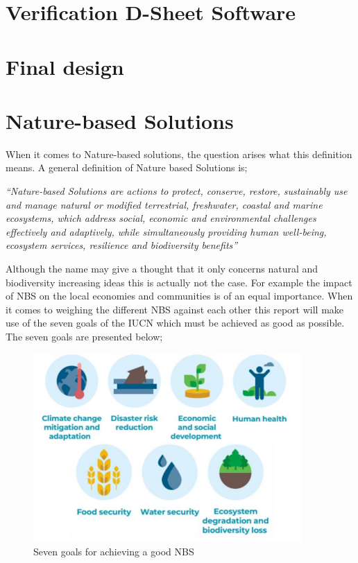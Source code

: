 \section{Verification D-Sheet Software}

\section{Final design}

\newpage

\section{Nature-based Solutions}

When it comes to Nature-based solutions, the question arises what this definition means. A general definition of Nature based Solutions is;

\textit{“Nature-based Solutions are actions to protect, conserve, restore, sustainably
use and manage natural or modified terrestrial, freshwater, coastal and marine
ecosystems, which address social, economic and environmental challenges
effectively and adaptively, while simultaneously providing human well-being,
ecosystem services, resilience and biodiversity benefits” \autocite{eiselinVerenigdeNatiesStemmen2022}}

Although the name may give a thought that it only concerns natural and biodiversity increasing ideas this is actually not the case. For example the impact of NBS on the local economies and communities is of an equal importance. When it comes to weighing the different NBS against each other this report will make use of the seven goals of the IUCN which must be achieved as good as possible. The seven goals are presented below;

\begin{figure}[H]
    \centering
    \includegraphics[width=0.50\linewidth]{figures/ThesevenNBSgoals.png}
    \caption{Seven goals for achieving a good NBS \autocite{.....}}
    \label{fig:7g}
\end{figure}


